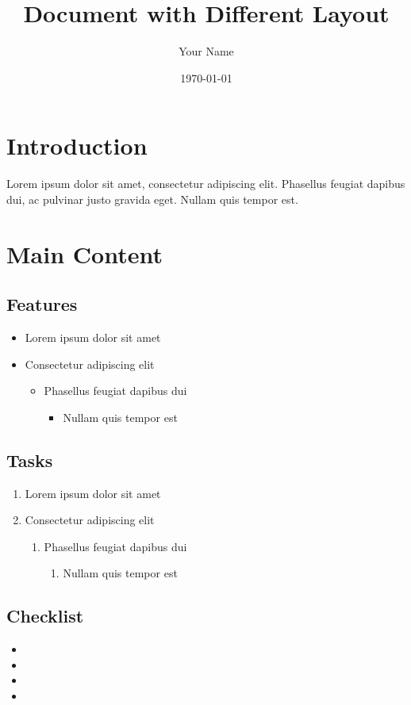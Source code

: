 \documentclass{article}
\begin{document}
\title{Document with Different Layout}
\author{Your Name}
\date{\today}
\maketitle

\section{Introduction}
Lorem ipsum dolor sit amet, consectetur adipiscing elit. Phasellus feugiat dapibus dui, ac pulvinar justo gravida eget. Nullam quis tempor est.

\section{Main Content}
\subsection{Features}
\begin{itemize}[label=\textbullet]
    \item Lorem ipsum dolor sit amet
    \item Consectetur adipiscing elit
    \begin{itemize}[label=-]
        \item Phasellus feugiat dapibus dui
        \begin{itemize}[label=*]
            \item Nullam quis tempor est
        \end{itemize}
    \end{itemize}
\end{itemize}

\subsection{Tasks}
\begin{enumerate}
    \item Lorem ipsum dolor sit amet
    \item Consectetur adipiscing elit
    \begin{enumerate}
        \item Phasellus feugiat dapibus dui
        \begin{enumerate}
            \item Nullam quis tempor est
        \end{enumerate}
    \end{enumerate}
\end{enumerate}

\subsection{Checklist}
\begin{itemize}[label=--, leftmargin=*]
    \item[]  
    \item[]  
    \item[]  
    \item[]  
\end{itemize}
\end{document}
